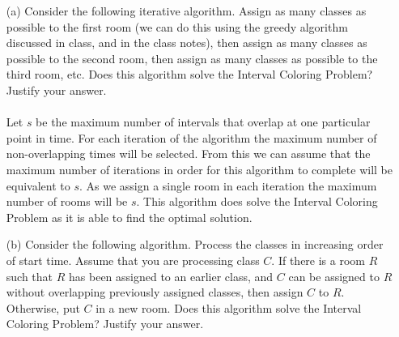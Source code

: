\documentclass[10pt]{article}
\begin{document}
	\begin{enumerate}
		\item[(a)] Consider the following iterative algorithm. Assign as many classes as possible to the
		first room (we can do this using the greedy algorithm discussed in class, and in the class notes),
		then assign as many classes as possible to the second room, then assign as many classes as possible
		to the third room, etc. Does this algorithm solve the Interval Coloring Problem? Justify your answer.\\
		\\
		Let $s$ be the maximum number of intervals that overlap at one particular point in time. For each iteration
		of the algorithm the maximum number of non-overlapping times will be selected. From this we can assume that
		the maximum number of iterations in order for this algorithm to complete will be equivalent to $s$. As we 
		assign a single room in each iteration the maximum number of rooms will be $s$. This algorithm does solve 
		the Interval Coloring Problem as it is able to find the optimal solution.
		 
		\item[(b)] Consider the following algorithm. Process the classes in increasing order of start time. Assume
		that you are processing class $C$. If there is a room $R$ such that $R$ has been assigned to an earlier
		class, and $C$ can be assigned to $R$ without overlapping previously assigned classes, then assign $C$ to
		$R$. Otherwise, put $C$ in a new room. Does this algorithm solve the Interval Coloring Problem? Justify your answer.\\
		\\
	\end{enumerate}
\end{document}
